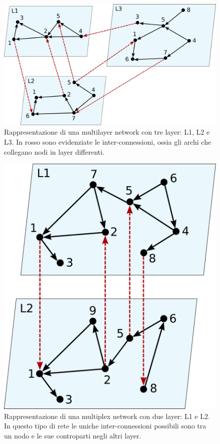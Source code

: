\begin{figure}[h]
    \centering
    \includegraphics[height=0.3\textheight]{img/definitions/mlexample.pdf}
    \caption{Rappresentazione di una multilayer network con tre layer: L1, L2 e L3.
    In rosso sono evidenziate le inter-connessioni, ossia gli archi che collegano nodi in 
    layer differenti.}
    \label{fig:mlexample}
\end{figure}

\begin{figure}
    \centering
    \includegraphics[height=0.3\textheight]{img/definitions/muxexample.pdf}
    \caption{Rappresentazione di una multiplex network con due layer: L1 e L2. In questo 
    tipo di rete le uniche inter-connessioni possibili sono tra un nodo e le sue controparti 
    negli altri layer.}
    \label{fig:muxexample}
\end{figure}

